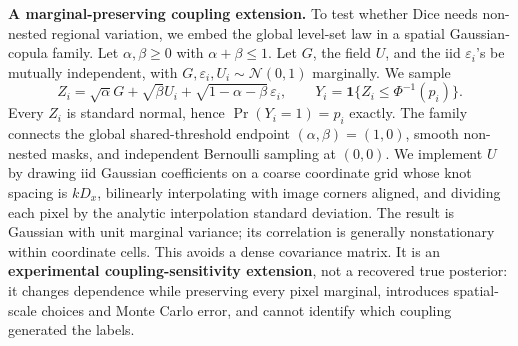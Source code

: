 \noindent\textbf{A marginal-preserving coupling extension.}
To test whether Dice needs non-nested regional variation, we embed the global
level-set law in a spatial Gaussian-copula family. Let
\(\alpha,\beta\geq0\) with \(\alpha+\beta\leq1\). Let \(G\), the field \(U\),
and the iid \(\varepsilon_i\)'s be mutually independent, with
\(G,\varepsilon_i,U_i\sim\mathcal N(0,1)\) marginally. We sample
\begin{equation*}
  Z_i=\sqrt{\alpha}G+\sqrt{\beta}U_i+\sqrt{1-\alpha-\beta}\,\varepsilon_i,
  \qquad Y_i=\mathbf 1\{Z_i\leq\Phi^{-1}(p_i)\}.
\end{equation*}
Every \(Z_i\) is standard normal, hence \(\Pr(Y_i=1)=p_i\) exactly. The family
connects the global shared-threshold endpoint \((\alpha,\beta)=(1,0)\), smooth
non-nested masks, and independent Bernoulli sampling at \((0,0)\). We implement
\(U\) by drawing iid Gaussian coefficients on a coarse coordinate grid whose
knot spacing is \(kD_x\), bilinearly interpolating with image corners aligned,
and dividing each pixel by the analytic interpolation standard deviation.
The result is Gaussian with unit marginal variance; its correlation is
generally nonstationary within coordinate cells. This avoids a dense covariance
matrix. It is an \textbf{experimental coupling-sensitivity extension}, not a
recovered true posterior: it changes dependence while preserving every pixel
marginal, introduces spatial-scale choices and Monte Carlo error, and cannot
identify which coupling generated the labels.

